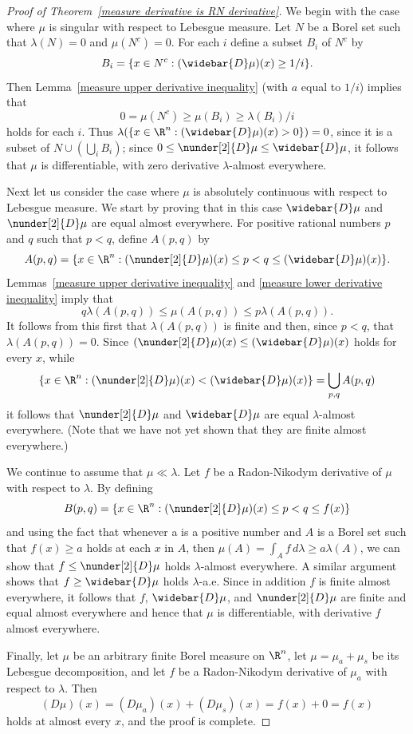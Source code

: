 \begin{proof}[Proof of Theorem~\ref{measure derivative is RN derivative}]
We begin with the case where $\mu$ is singular with respect to Lebesgue measure. Let $N$ be a Borel set such that $\lambda(N)=0$ and $\mu(N^c)=0$. For each $i$ define a subset $B_i$ of $N^c$ by
\[B_i=\{x\in N^c:(\widebar{D}\mu)(x)\geq 1/i\}.\]
Then Lemma~\ref{measure upper derivative inequality} (with $a$ equal to $1/i$) implies that
\[0=\mu(N^c)\geq\mu(B_i)\geq\lambda(B_i)/i\]
holds for each $i$. Thus $\lambda(\{x\in\R^n:(\widebar{D}\mu)(x)>0\})=0$, since it is a subset of $N\cup(\bigcup_iB_i)$; since $0\leq\nunder[2]{D}\mu\leq\widebar{D}\mu$, it follows that $\mu$ is differentiable, with zero derivative $\lambda$-almost everywhere.\par
Next let us consider the case where $\mu$ is absolutely continuous with respect to Lebesgue measure. We start by proving that in this case $\widebar{D}\mu$ and $\nunder[2]{D}\mu$ are equal almost everywhere. For positive rational numbers $p$ and $q$ such that $p<q$, define $A(p,q)$ by
\[A(p,q)=\{x\in\R^n:(\nunder[2]{D}\mu)(x)\leq p<q\leq(\widebar{D}\mu)(x)\}.\]
Lemmas~\ref{measure upper derivative inequality} and \ref{measure lower derivative inequality} imply that
\[q\lambda(A(p,q))\leq\mu(A(p,q))\leq p\lambda(A(p,q)).\]
It follows from this first that $\lambda(A(p,q))$ is finite and then, since $p<q$, that $\lambda(A(p,q))=0$. Since $(\nunder[2]{D}\mu)(x)\leq(\widebar{D}\mu)(x)$ holds for every $x$, while
\[\{x\in\R^n:(\nunder[2]{D}\mu)(x)<(\widebar{D}\mu)(x)\}=\bigcup_{p,q}A(p,q)\]
it follows that $\nunder[2]{D}\mu$ and $\widebar{D}\mu$ are equal $\lambda$-almost everywhere. (Note that we have not yet shown that they are finite almost everywhere.)\par
We continue to assume that $\mu\ll\lambda$. Let $f$ be a Radon-Nikodym derivative of $\mu$ with respect to $\lambda$. By defining
\[B(p,q)=\{x\in\R^n:(\nunder[2]{D}\mu)(x)\leq p<q\leq f(x)\}\]
and using the fact that whenever a is a
positive number and $A$ is a Borel set such that $f(x)\geq a$ holds at each $x$ in $A$, then $\mu(A)=\int_Af\,d\lambda\geq a\lambda(A)$, we can show that $f\leq\nunder[2]{D}\mu$ holds $\lambda$-almost everywhere. A similar argument shows that $f\geq\widebar{D}\mu$ holds $\lambda$-a.e. Since in addition $f$ is finite almost everywhere, it follows that $f$, $\widebar{D}\mu$, and $\nunder[2]{D}\mu$ are finite and equal almost everywhere and hence that $\mu$ is differentiable, with derivative $f$ almost everywhere.\par
Finally, let $\mu$ be an arbitrary finite Borel measure on $\R^n$, let $\mu=\mu_a+\mu_s$ be its Lebesgue decomposition, and let $f$ be a Radon-Nikodym derivative of $\mu_a$ with respect to $\lambda$. Then
\[(D\mu)(x)=(D\mu_a)(x)+(D\mu_s)(x)=f(x)+0=f(x)\]
holds at almost every $x$, and the proof is complete.
\end{proof}
